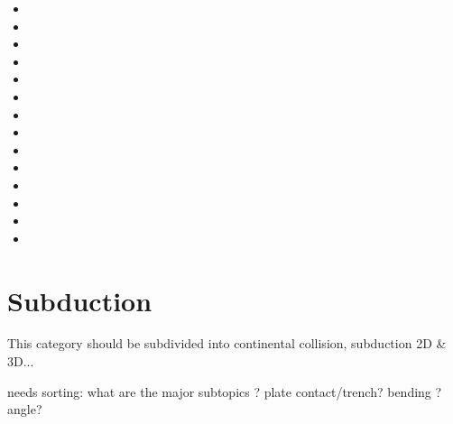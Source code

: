 \begin{scriptsize}
\begin{itemize}
\item[\nineteenninetysix] 
\item[\nineteenninetyseven] 
\item[\nineteenninetyeight] 
\item[\nineteenninetynine] 
\item[\twothousand] 
\item[\twothousandtwo] 
\item[\twothousandfour] 
\item[\twothousandfive] 
\item[\twothousandnine] 
\item[\twothousandten] 
\item[\twothousandeleven] 
\item[\twothousandfourteen] 
\item[\twothousandsixteen] 
\item[\twothousandseventeen] 
\end{itemize}
\end{scriptsize}


\section{Subduction} 
This category should be subdivided into continental collision, subduction 2D \& 3D...

{\color{red} needs sorting: what are the major subtopics ? plate contact/trench? bending ? 
angle? } 

